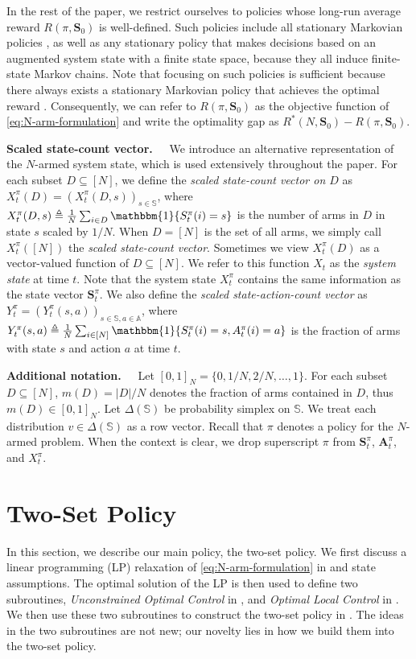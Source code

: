 \documentclass[11pt,letterpaper]{article}
\theoremstyle{plain}
\theoremstyle{definition}
\theoremstyle{remark}
\newcommand{\indibrac}[1]{\mathbbm{1}\!\left\{#1\right\}}
\newcommand{\ve}[1]{\bm{#1}}
\newcommand{\veS}{\ve{S}}
\newcommand{\veA}{\ve{A}}
\newcommand{\sspa}{\mathbb{S}}
\newcommand{\aspa}{\mathbb{A}}
\newcommand{\sumN}{\sum_{i\in[N]}}
\newcommand{\ravg}{R}
\newcommand{\rsysn}{\ravg(\pi, \veS_0)}
\newcommand{\ropt}{\ravg^*(N, \veS_0)}
\begin{document}
In the rest of the paper, we restrict ourselves to policies whose long-run average reward $\rsysn$ is well-defined. Such policies include all stationary Markovian policies \citep[][Proposition 8.1.1]{Put_05}, as well as any stationary policy that makes decisions based on an augmented system state with a finite state space, because they all induce finite-state Markov chains. 
Note that focusing on such policies is sufficient because there always exists a stationary Markovian policy that achieves the optimal reward \citep[][Theorem~9.1.8]{Put_05}. 
Consequently, we can refer to $\rsysn$ as the objective function of \eqref{eq:N-arm-formulation} and write the optimality gap as $\ropt - \rsysn$. 


\textbf{Scaled state-count vector.~~}
We introduce an alternative representation of the $N$-armed system state, 
which is used extensively throughout the paper.
For each subset $D\subseteq[N]$, we define the \emph{scaled state-count vector on $D$} as $X_t^\pi(D) = (X_t^\pi(D, s))_{s\in\sspa}$, where 
$
    X_t^\pi(D, s) \triangleq \frac{1}{N} \sum_{i\in D} \indibrac{S_t^\pi(i) = s}
$ is the number of arms in $D$ in state $s$ scaled by $1/N.$ 
When $D = [N]$ is the set of all arms, we simply call $X_t^\pi([N])$ the \emph{scaled state-count vector}. 
Sometimes we view $X_t^\pi(D)$ as a vector-valued function of $D \subseteq [N]$. We refer to this function $X_t$ as the \emph{system state} at time $t$. Note that the system state $X_t^\pi$ contains the same information as the state vector $\veS_t^\pi$. 
We also define the \emph{scaled state-action-count vector} as $Y_t^\pi = (Y_t^\pi(s, a))_{s\in\sspa, a\in\aspa}$, where
$Y_t^\pi(s,a) \triangleq \frac{1}{N} \sumN \indibrac{S_t^\pi(i)=s, A_t^\pi(i) = a}$ is the fraction of arms with state $s$ and action $a$ at time $t$. 


\textbf{Additional notation.~~} Let $[0,1]_N = \{0,1/N, 2/N,\dots, 1\}$. For each subset $D\subseteq[N]$, $m(D) = |D| / N$ denotes the fraction of arms contained in $D$, thus $m(D) \in [0,1]_N.$ 
Let $\Delta(\sspa)$ be probability simplex on  $\sspa$.
We treat each distribution $v\in\Delta(\sspa)$ as a row vector.
Recall that $\pi$ denotes a policy for the $N$-armed problem. When the context is clear, we drop superscript $\pi$ from $\veS_t^\pi$, $\veA_t^\pi$, and $X_t^\pi$. 


\section{Two-Set Policy}\label{sec:preliminaries}
In this section, we describe our main policy, the two-set policy.  
We first discuss a linear programming (LP) relaxation of \eqref{eq:N-arm-formulation} in  and state assumptions. 
The optimal solution of the LP is then used to define two subroutines, \emph{Unconstrained Optimal Control} in , and \emph{Optimal Local Control} in . We then use these two subroutines to construct the two-set policy in . 
The ideas in the two subroutines are not new; our novelty lies in how we build them into the two-set policy. 
\end{document}

